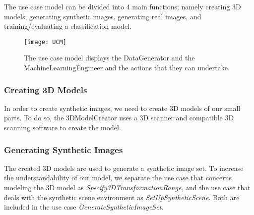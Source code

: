 The use case model can be divided into 4 main functions; namely creating 3D models, generating synthetic images, generating real images, and training/evaluating a classification model.

\begin{figure}[h]
\centering
  \texttt{[image: UCM]}
\caption{The use case model displays the DataGenerator and the MachineLearningEngineer and the actions that they can undertake.}
\label{fig:UCM}
\end{figure}

\clearpage
\subsubsection{Creating 3D Models}
In order to create synthetic images, we need to create 3D models of our small parts. To do so, the 3DModelCreator uses a 3D scanner and compatible 3D scanning software to create the model.

\begin{usecase}





\end{usecase}

\newpage
\subsubsection{Generating Synthetic Images}
The created 3D models are used to generate a synthetic image set. To increase the understandability of our model, we separate the use case that concerns modeling the 3D model as \textit{Specify3DTransformationRange}, and the use case that deals with the synthetic scene environment as \textit{SetUpSyntheticScene}. Both are included in the use case \textit{GenerateSyntheticImageSet}.

